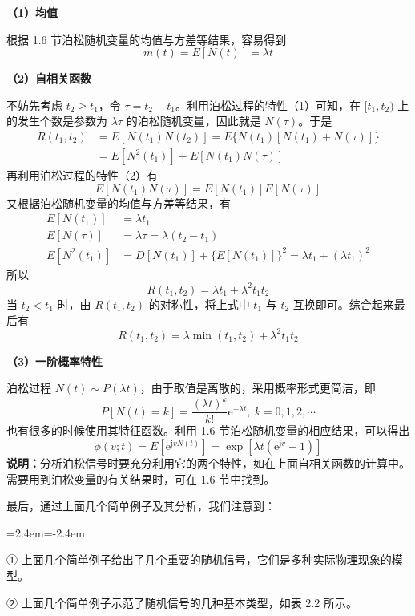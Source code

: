 \documentclass[11pt,openany,UTF8]{ctexbook}
\newcommand{\eu}{\mathrm{e}}                       %
\newcommand{\ju}{\mathrm{j}}                       %
\newcommand{\E}{E}                                 %
\newcommand{\bhead}[1]{\par\medskip\noindent\textbf{#1}\par\smallskip}
\newenvironment{citemize}
  {\begin{list}{}{\leftmargin=2.4em\itemindent=-2.4em\itemsep=1pt\topsep=3pt\parsep=0pt}}
  {\end{list}}
\begin{document}
\bhead{（1\nobreak）均值}
根据 1.6 节泊松随机变量的均值与方差等结果\nobreak，容易得到
\begin{equation}
m(t)=\E[N(t)]=\lambda t
\label{eq:2.15}
\end{equation}
\bhead{（2\nobreak）自相关函数}
不妨先考虑 $t_2\geqslant t_1$\nobreak，令 $\tau=t_2-t_1$\nobreak。利用泊松过程的特性（1\nobreak）可知\nobreak，在 $[t_1,t_2)$ 上的发生个数是参数为 $\lambda\tau$ 的泊松随机变量\nobreak，因此就是 $N(\tau)$\nobreak。于是
\begin{align*}
R(t_1,t_2)&=\E[N(t_1)N(t_2)]=\E\{N(t_1)[N(t_1)+N(\tau)]\}\\
&=\E\left[N^2(t_1)\right]+\E[N(t_1)N(\tau)]
\end{align*}
再利用泊松过程的特性（2\nobreak）有
\[
\E[N(t_1)N(\tau)]=\E[N(t_1)]\E[N(\tau)]
\]
又根据泊松随机变量的均值与方差等结果\nobreak，有
\begin{align*}
\E[N(t_1)]&=\lambda t_1\\
\E[N(\tau)]&=\lambda\tau=\lambda(t_2-t_1)\\
\E\left[N^2(t_1)\right]&=D[N(t_1)]+\{\E[N(t_1)]\}^2=\lambda t_1+(\lambda t_1)^2
\end{align*}
所以
\[
R(t_1,t_2)=\lambda t_1+\lambda^2t_1t_2
\]
当 $t_2<t_1$ 时\nobreak，由 $R(t_1,t_2)$ 的对称性\nobreak，将上式中 $t_1$ 与 $t_2$ 互换即可\nobreak。综合起来最后有
\begin{equation}
R(t_1,t_2)=\lambda\min(t_1,t_2)+\lambda^2t_1t_2
\label{eq:2.16}
\end{equation}
\bhead{（3\nobreak）一阶概率特性}
泊松过程 $N(t)\sim P(\lambda t)$\nobreak，由于取值是离散的\nobreak，采用概率形式更简洁\nobreak，即
\[
P[N(t)=k]=\frac{(\lambda t)^k}{k!}\eu^{-\lambda t},\ k=0,1,2,\cdots
\]
也有很多的时候使用其特征函数\nobreak。利用 1.6 节泊松随机变量的相应结果\nobreak，可以得出
\begin{equation}
\phi(v;t)=\E\left[\eu^{\ju vN(t)}\right]=\exp\left[\lambda t\left(\eu^{\ju v}-1\right)\right]
\label{eq:2.17}
\end{equation}
\textbf{说明\nobreak：}分析泊松信号时要充分利用它的两个特性\nobreak，如在上面自相关函数的计算中\nobreak。需要用到泊松变量的有关结果时\nobreak，可在 1.6 节中找到\nobreak。

最后\nobreak，通过上面几个简单例子及其分析\nobreak，我们注意到\nobreak：

\begin{citemize}
\item ① 上面几个简单例子给出了几个重要的随机信号\nobreak，它们是多种实际物理现象的模型\nobreak。
\item ② 上面几个简单例子示范了随机信号的几种基本类型\nobreak，如表 2.2 所示\nobreak。
\end{citemize}
\end{document}
